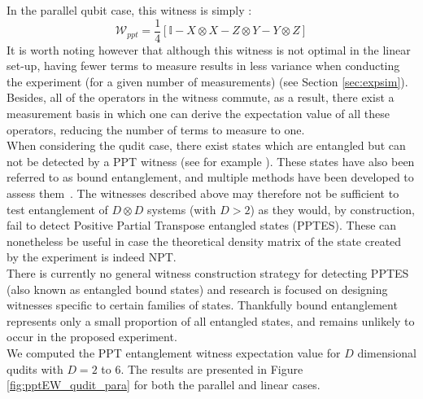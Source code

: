 \documentclass[%
 reprint,
 superscriptaddress,
 amsmath,
 amssymb,
 aps,
 longbibliography
]{revtex4-2}
\begin{document}
In the parallel qubit case, this witness is simply \cite{Chevalier:2020uvv}:
		\begin{equation}
			\mathcal{W}_{ppt} = \frac{1}{4}[\mathbb{I} - X\otimes X - Z \otimes Y - Y \otimes Z]
		\end{equation} 
\indent It is worth noting however that although this witness is not optimal in the linear set-up, having fewer terms to measure results in less variance when conducting the experiment (for a given number of measurements) (see Section \ref{sec:expsim}). Besides, all of the operators in the witness commute, as a result, there exist a measurement basis in which one can derive the expectation value of all these operators, reducing the number of terms to measure to one. \\
\indent When considering the qudit case, there exist states which are entangled but can not be detected by a PPT witness (see for example \cite{Horodecki1997, Horodecki1999}). These states have also been referred to as bound entanglement, and multiple methods have been developed to assess them~\cite{Horodecki1998, Yu2005,Guhne2006, Chruscinski2007, Chruscinski2011, Rudolph2003}. The witnesses described above may therefore not be sufficient to test entanglement of $D\otimes D$ systems (with $D>2$) as they would, by construction, fail to detect Positive Partial Transpose entangled states (PPTES). These can nonetheless be useful in case the theoretical density matrix of the state created by the experiment is indeed NPT. \\
\indent There is currently no general witness construction strategy for detecting PPTES (also known as entangled bound states) and research is focused on designing witnesses specific to certain families of states. Thankfully bound entanglement represents only a small proportion of all entangled states, and remains unlikely to occur in the proposed experiment. \\
\indent We computed the PPT entanglement witness expectation value for $D$ dimensional qudits with $D=2$ to $6$. The results are presented in Figure \ref{fig:pptEW_qudit_para} for both the parallel and linear cases.\\
\end{document}
